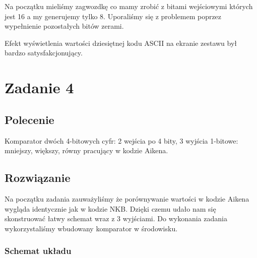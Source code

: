 \documentclass[a4paper,12pt]{extarticle}  %
\begin{document}
Na początku mieliśmy zagwozdkę co mamy zrobić z bitami wejściowymi których jest 16 a my generujemy tylko 8. Uporaliśmy się z problemem poprzez wypełnienie pozostałych bitów zerami.

Efekt wyświetlenia wartości dziesiętnej kodu ASCII na ekranie zestawu był bardzo satysfakcjonujący.
\section{Zadanie 4}
\subsection{Polecenie}
Komparator dwóch 4-bitowych cyfr: 2 wejścia po 4 bity, 3 wyjścia 1-bitowe: 
mniejszy, większy, równy pracujący w kodzie Aikena.
\subsection{Rozwiązanie}
Na początku zadania zauważyliśmy że porównywanie wartości w kodzie Aikena wygląda identycznie jak w kodzie NKB.
Dzięki czemu udało nam się skonstruować łatwy schemat wraz z 3 wyjściami.
Do wykonania zadania wykorzystaliśmy wbudowany komparator w środowisku.
\subsubsection{Schemat układu}
\begin{figure}[H]
   \centering
\end{figure}
\end{document}
